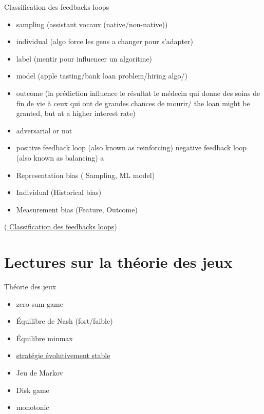 \documentclass[aspectratio=169,xcolor=dvipsnames]{beamer}
\begin{document}
\begin{frame}{Classification des feedbacks loops}
    \begin{itemize}
        \item sampling (assistant vocaux (native/non-native))
        \item individual (algo force les gens a changer pour s'adapter)
        \item label (mentir pour influencer un algoritme)
        \item model (apple tasting/bank loan problem/hiring algo/)
        \item outcome (la prédiction influence le résultat le médecin qui donne des soins de fin de vie à ceux qui ont de grandes chances de mourir/ the loan might be granted, but at a higher interest rate)
        \item adversarial or not 
        \item 
positive feedback loop (also known as reinforcing)  negative feedback loop
(also known as balancing) a
\item Representation bias ( Sampling, ML model)
\item Individual (Historical bias)
\item Measurement bias (Feature, Outcome)
    \end{itemize}
        (\href{http://dx.doi.org/10.1145/3617694.3623227}{\color{blue} Classification des feedbacks loops})
\end{frame}

\section{Lectures sur la théorie des jeux}

\begin{frame}{Théorie des jeux}
    \begin{itemize}
        \item zero sum game
        \item Équilibre de Nash (fort/faible)
        \item Équilibre minmax
        \item  \href{https://fr.wikipedia.org/wiki/Strat\%C3\%A9gie_\%C3\%A9volutivement_stable}{\color{blue} stratégie évolutivement stable}
        \item Jeu de Markov
        \item Disk game
        \item monotonic
        
    \end{itemize}
\end{frame}
\end{document}
